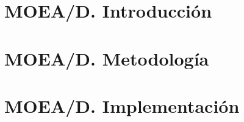 \documentclass[11pt]{article}
\renewcommand{\{}{\left\lbrace}
\renewcommand{\}}{\right\rbrace}
\begin{document}
\section{MOEA/D. Introducción}


\section{MOEA/D. Metodología}


\section{MOEA/D. Implementación}









 


% 
% 
% 
\end{document}
